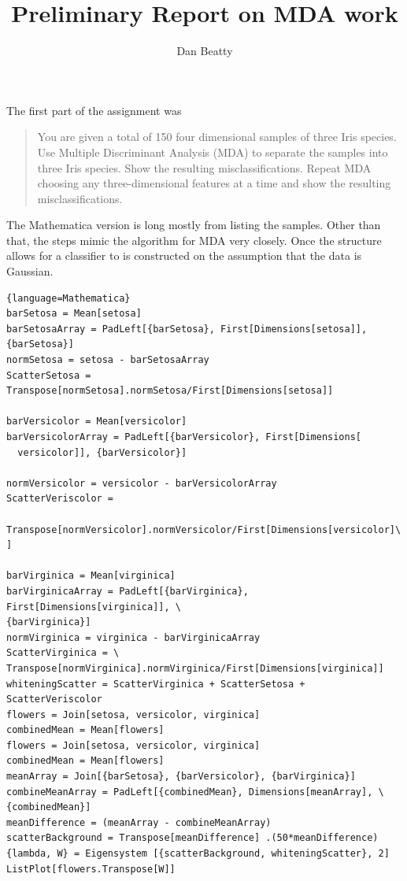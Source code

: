 \documentclass[11pt]{article}
\title{Preliminary Report on MDA work}
\author{Dan Beatty}
\begin{document}
\maketitle

The first part of the assignment was 
\begin{quote}
	You are given a total of 150 four dimensional samples of three Iris species.  Use Multiple Discriminant Analysis (MDA) to separate the samples into three Iris species. Show the resulting misclassifications.   Repeat MDA choosing any three-dimensional features at a time and show the resulting misclassifications.
\end{quote}

The Mathematica version is long mostly from listing the samples.  Other than that, the steps mimic the algorithm for MDA very closely.  Once the structure allows for a classifier to is constructed on the assumption that the data is Gaussian.  

\begin{lstlisting}{language=Mathematica}
barSetosa = Mean[setosa]
barSetosaArray = PadLeft[{barSetosa}, First[Dimensions[setosa]], {barSetosa}]
normSetosa = setosa - barSetosaArray
ScatterSetosa = Transpose[normSetosa].normSetosa/First[Dimensions[setosa]]

barVersicolor = Mean[versicolor]
barVersicolorArray = PadLeft[{barVersicolor}, First[Dimensions[
  versicolor]], {barVersicolor}]

normVersicolor = versicolor - barVersicolorArray
ScatterVeriscolor =
         Transpose[normVersicolor].normVersicolor/First[Dimensions[versicolor]\
]

barVirginica = Mean[virginica]
barVirginicaArray = PadLeft[{barVirginica}, First[Dimensions[virginica]], \
{barVirginica}]
normVirginica = virginica - barVirginicaArray
ScatterVirginica = \
Transpose[normVirginica].normVirginica/First[Dimensions[virginica]]
whiteningScatter = ScatterVirginica + ScatterSetosa + ScatterVeriscolor
flowers = Join[setosa, versicolor, virginica]
combinedMean = Mean[flowers]
flowers = Join[setosa, versicolor, virginica]
combinedMean = Mean[flowers]
meanArray = Join[{barSetosa}, {barVersicolor}, {barVirginica}]
combineMeanArray = PadLeft[{combinedMean}, Dimensions[meanArray], \
{combinedMean}]
meanDifference = (meanArray - combineMeanArray)
scatterBackground = Transpose[meanDifference] .(50*meanDifference)
{lambda, W} = Eigensystem [{scatterBackground, whiteningScatter}, 2]
ListPlot[flowers.Transpose[W]]
\end{lstlisting}
\end{document}
